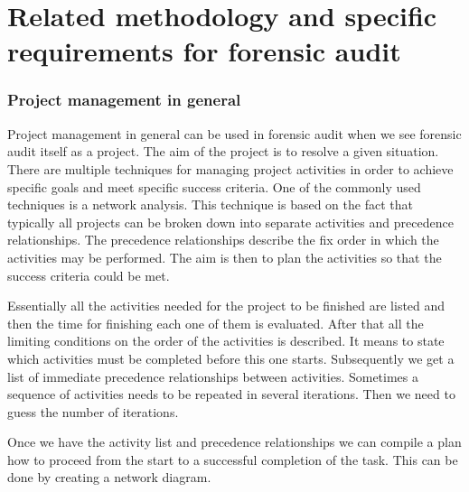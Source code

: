 \chapter{Related methodology and specific requirements for forensic audit}


\subsection{Project management in general}

Project management in general can be used in forensic audit when we see forensic audit itself as a project. The aim of the project is to resolve a given situation. 
There are multiple techniques for managing project activities in order to achieve specific goals and meet specific success criteria. One of the commonly used techniques is a network analysis. This technique is based on the fact that typically all projects can be broken down into separate activities and precedence relationships.  The precedence relationships describe the fix order in which the activities may be performed. The aim is then to plan the activities so that the success criteria could be met. 

Essentially all the activities needed for the project to be finished are listed and then the time for finishing each one of them is evaluated. After that all the limiting conditions on the order of the activities is described. It means to state which activities must be completed before this one starts. Subsequently we get a list of immediate precedence relationships between activities. Sometimes a sequence of activities needs to be repeated in several iterations. Then we need to guess  the number of iterations.

Once we have the activity list and precedence relationships we can compile a plan how to proceed from the start to a successful completion of the task. This can be done by creating a network diagram. 



